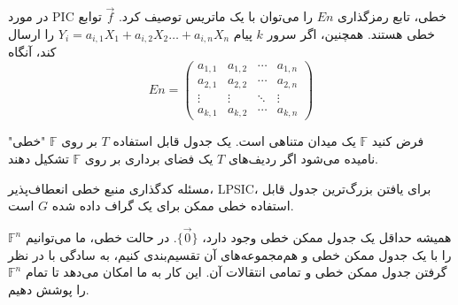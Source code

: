 \begin{note}
    در مورد PIC خطی، تابع رمزگذاری $En$ را می‌توان با یک ماتریس توصیف کرد. $\overrightarrow{f}$ توابع خطی هستند. همچنین، اگر سرور $k$ پیام $Y_i = a_{i,1} X_1 + a_{i,2} X_2 \ldots + a_{i,n} X_n$ را ارسال کند، آنگاه
    \begin{equation*}
        En =
        \begin{pmatrix}
            a_{1,1} & a_{1,2} & \cdots & a_{1,n} \\
            a_{2,1} & a_{2,2} & \cdots & a_{2,n} \\
            \vdots  & \vdots  & \ddots & \vdots  \\
            a_{k,1} & a_{k,2} & \cdots & a_{k,n}
        \end{pmatrix}
    \end{equation*}
\end{note}

\begin{definition}
    فرض کنید $\mathbb{F}$ یک میدان متناهی است. یک جدول قابل استفاده $T$ بر روی $\mathbb{F}$ "خطی" نامیده می‌شود اگر ردیف‌های $T$ یک فضای برداری بر روی $\mathbb{F}$ تشکیل دهند.
\end{definition}

مسئله کدگذاری منبع خطی انعطاف‌پذیر، LPSIC، برای یافتن بزرگ‌ترین جدول قابل استفاده خطی ممکن برای یک گراف داده شده $G$ است.


\begin{remark}
    همیشه حداقل یک جدول ممکن خطی وجود دارد، $\{\overrightarrow{0}\}$. در حالت خطی، ما می‌توانیم $\mathbb{F}^n$ را با یک جدول ممکن خطی و هم‌مجموعه‌های آن تقسیم‌بندی کنیم، به سادگی با در نظر گرفتن جدول ممکن خطی و تمامی انتقالات آن. این کار به ما امکان می‌دهد تا تمام $\mathbb{F}^n$ را پوشش دهیم.
\end{remark}


